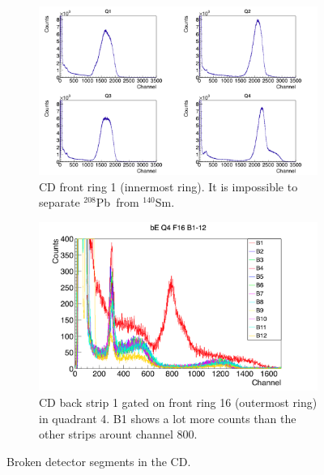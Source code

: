 \documentclass[twoside,english]{uiofysmaster/uiofysmaster}
\newcommand{\Sm}{$^{140}$Sm} %
\newcommand{\Pb}{$^{208}$Pb}
\begin{document}
\begin{figure}[ht]
	\centering
	\begin{subfigure}{\textwidth}
		\centering
		\includegraphics[width=\textwidth]{../Plots/plotting/Q1-4_f1.png}
		\caption{CD front ring 1 (innermost ring). It is impossible to separate \Pb\ from \Sm.}
		\label{fig:BDS_R1}
	\end{subfigure}
	\begin{subfigure}{\textwidth}
		\centering
		\includegraphics[width=\textwidth]{../Plots/plotting/bE_Q4_f16_b1-12.png}
		\caption{CD back strip 1 gated on front ring 16 (outermost ring) in quadrant 4. B1 shows a lot more counts than the other strips arount channel 800.}
		\label{fig:BDS_B1}
	\end{subfigure}
	\caption{Broken detector segments in the CD.}
	\label{fig:BDS}
\end{figure}
\end{document}
